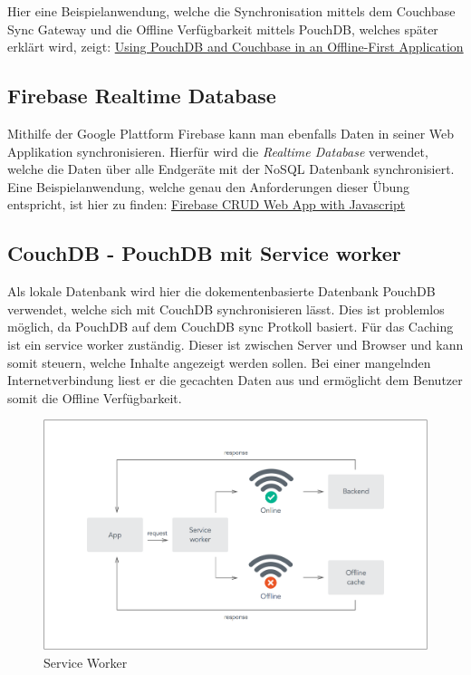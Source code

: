 Hier eine Beispielanwendung, welche die Synchronisation mittels dem Couchbase Sync Gateway und die Offline Verfügbarkeit mittels PouchDB, welches später erklärt wird, zeigt:
\href{https://www.codementor.io/pmbanugo/using-pouchdb-and-couchbase-in-an-offline-first-application-5pw2sxs6o}{Using PouchDB and Couchbase in an Offline-First Application\cite{syncgatewaytutorial}}

\url{}

\subsection{Firebase Realtime Database}
Mithilfe der Google Plattform Firebase kann man ebenfalls Daten in seiner Web Applikation synchronisieren. Hierfür wird die \textit{Realtime Database}\cite{realtimedb} verwendet, welche die Daten über alle Endgeräte mit der NoSQL Datenbank synchronisiert. Eine Beispielanwendung, welche genau den Anforderungen dieser Übung entspricht, ist hier zu finden: \href{http://softauthor.com/learn-to-build-firebase-crud-app-with-javascript-part01-reading-data/}{Firebase CRUD Web App with Javascript}\cite{firebaseexample} 


\subsection{CouchDB - PouchDB mit Service worker}
Als lokale Datenbank wird hier die dokementenbasierte Datenbank PouchDB verwendet, welche sich mit CouchDB synchronisieren lässt. Dies ist problemlos möglich, da PouchDB auf dem CouchDB sync Protkoll\cite{couchdbsyncprot} basiert.\cite{pouchdbintro} Für das Caching ist ein service worker\cite{serviceworker} zuständig. Dieser ist zwischen Server und Browser und kann somit steuern, welche Inhalte angezeigt werden sollen. Bei einer mangelnden Internetverbindung liest er die gecachten Daten aus und ermöglicht dem Benutzer somit die Offline Verfügbarkeit.

\begin{figure}[!h]
  \begin{center}
    \includegraphics[width=0.7\linewidth]{images/offline-first-diagram.png}
     \caption{Service Worker\cite{serviceworkertutorial}}
    \label{broker}
  \end{center}
\end{figure}

